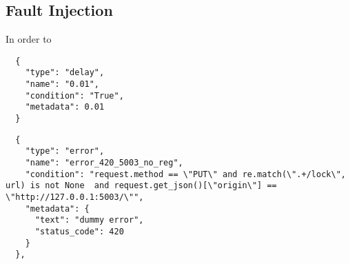 \subsection{Fault Injection}
\label{subsec:fault_injection}
In order to 

\begin{multicols}{2}
  \begin{verbatim}
  {
    "type": "delay",
    "name": "0.01",
    "condition": "True",
    "metadata": 0.01
  }
  \end{verbatim}

  \columnbreak

  \begin{verbatim}
  {
    "type": "error",
    "name": "error_420_5003_no_reg",
    "condition": "request.method == \"PUT\" and re.match(\".+/lock\", url) is not None  and request.get_json()[\"origin\"] == \"http://127.0.0.1:5003/\"",
    "metadata": {
      "text": "dummy error",
      "status_code": 420
    }
  },
  \end{verbatim}
\end{multicols}
